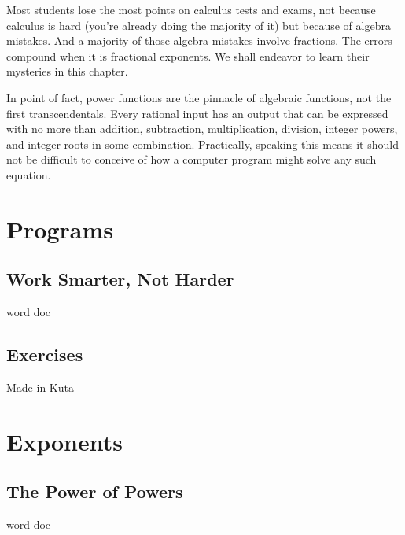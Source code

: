 

Most students lose the most points on calculus tests and exams, not because
calculus is hard (you're already doing the majority of it) but because of algebra mistakes.
And a majority of those algebra mistakes involve fractions.  The errors compound
when it is fractional exponents.  We shall endeavor to learn their mysteries in this chapter.

In point of fact, power functions are the pinnacle of algebraic functions, not the first
transcendentals.  Every rational input has an output that can be expressed with no 
more than addition, subtraction, multiplication, division, integer powers, and integer
roots in some combination.  Practically, speaking this means it should not be difficult
to conceive of how a computer program might solve any such equation.

\newpage
\chapterminitoc

\newpage
\section{Programs}
\subsection{Work Smarter, Not Harder}
word doc
\newpage

\newpage
\subsection{Exercises}
Made in Kuta
\newpage



\newpage
\section{Exponents}
\subsection{The Power of Powers}
word doc
\newpage

\newpage
